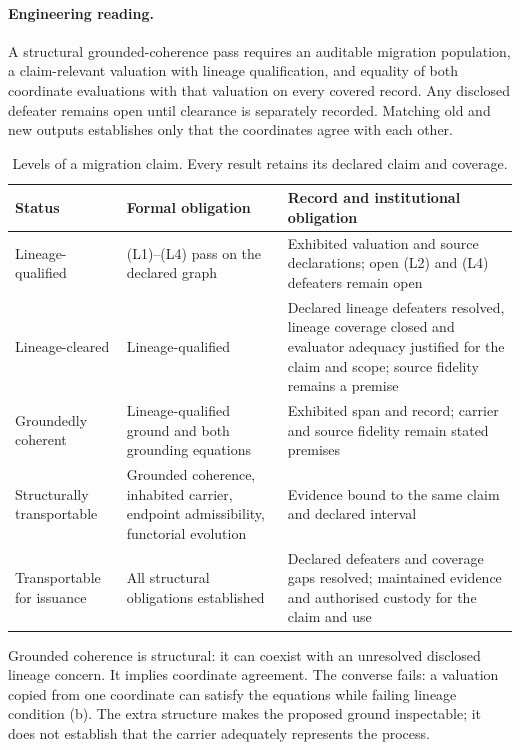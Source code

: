 \documentclass[twocolumn,envcountsect,envcountsame,natbib]{svjour3}
\begin{document}
\paragraph{Engineering reading.} A structural grounded-coherence pass requires an auditable migration population, a claim-relevant valuation with lineage qualification, and equality of both coordinate evaluations with that valuation on every covered record. Any disclosed defeater remains open until clearance is separately recorded. Matching old and new outputs establishes only that the coordinates agree with each other.

\begin{table}[htbp]
\centering\small
\caption{Levels of a migration claim. Every result retains its declared claim and coverage.}
\label{ex:tab:claim-levels}
\begin{tabularx}{\textwidth}{@{}p{3.1cm}LL@{}}
\toprule
Status & Formal obligation & Record and institutional obligation \\
\midrule
Lineage-qualified & (L1)--(L4) pass on the declared graph & Exhibited valuation and source declarations; open (L2) and (L4) defeaters remain open \\
Lineage-cleared & Lineage-qualified & Declared lineage defeaters resolved, lineage coverage closed and evaluator adequacy justified for the claim and scope; source fidelity remains a premise \\
Groundedly coherent & Lineage-qualified ground and both grounding equations & Exhibited span and record; carrier and source fidelity remain stated premises \\
Structurally transportable & Grounded coherence, inhabited carrier, endpoint admissibility, functorial evolution & Evidence bound to the same claim and declared interval \\
Transportable for issuance & All structural obligations established & Declared defeaters and coverage gaps resolved; maintained evidence and authorised custody for the claim and use \\
\bottomrule
\end{tabularx}
\end{table}

Grounded coherence is structural: it can coexist with an unresolved disclosed lineage concern. It implies coordinate agreement. The converse fails: a valuation copied from one coordinate can satisfy the equations while failing lineage condition (b). The extra structure makes the proposed ground inspectable; it does not establish that the carrier adequately represents the process.
\end{document}
